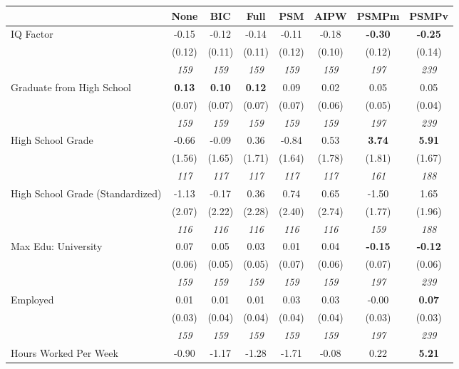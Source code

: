 \begin{tabular}{l c c c c c c c}
\toprule
 & None & BIC & Full & PSM & AIPW & PSMPm & PSMPv \\
\midrule
IQ Factor & -0.15 & -0.12 & -0.14 & -0.11 & -0.18 & \textbf{-0.30} & \textbf{-0.25} \\
& (0.12) & (0.11) & (0.11) & (0.12) & (0.10) & (0.12) & (0.14) \\
& \textit{ 159 } & \textit{ 159 } & \textit{ 159 } & \textit{ 159 } & \textit{ 159 } & \textit{ 197 } & \textit{ 239 } \\
Graduate from High School & \textbf{ 0.13 } & \textbf{ 0.10 } & \textbf{ 0.12 } & 0.09 & 0.02 & 0.05 & 0.05 \\
& (0.07) & (0.07) & (0.07) & (0.07) & (0.06) & (0.05) & (0.04) \\
& \textit{ 159 } & \textit{ 159 } & \textit{ 159 } & \textit{ 159 } & \textit{ 159 } & \textit{ 197 } & \textit{ 239 } \\
High School Grade & -0.66 & -0.09 & 0.36 & -0.84 & 0.53 & \textbf{3.74} & \textbf{5.91} \\
& (1.56) & (1.65) & (1.71) & (1.64) & (1.78) & (1.81) & (1.67) \\
& \textit{ 117 } & \textit{ 117 } & \textit{ 117 } & \textit{ 117 } & \textit{ 117 } & \textit{ 161 } & \textit{ 188 } \\
High School Grade (Standardized) & -1.13 & -0.17 & 0.36 & 0.74 & 0.65 & -1.50 & 1.65 \\
& (2.07) & (2.22) & (2.28) & (2.40) & (2.74) & (1.77) & (1.96) \\
& \textit{ 116 } & \textit{ 116 } & \textit{ 116 } & \textit{ 116 } & \textit{ 116 } & \textit{ 159 } & \textit{ 188 } \\
Max Edu: University & 0.07 & 0.05 & 0.03 & 0.01 & 0.04 & \textbf{-0.15} & \textbf{-0.12} \\
& (0.06) & (0.05) & (0.05) & (0.07) & (0.06) & (0.07) & (0.06) \\
& \textit{ 159 } & \textit{ 159 } & \textit{ 159 } & \textit{ 159 } & \textit{ 159 } & \textit{ 197 } & \textit{ 239 } \\
Employed & 0.01 & 0.01 & 0.01 & 0.03 & 0.03 & -0.00 & \textbf{0.07} \\
& (0.03) & (0.04) & (0.04) & (0.04) & (0.04) & (0.03) & (0.03) \\
& \textit{ 159 } & \textit{ 159 } & \textit{ 159 } & \textit{ 159 } & \textit{ 159 } & \textit{ 197 } & \textit{ 239 } \\
Hours Worked Per Week & -0.90 & -1.17 & -1.28 & -1.71 & -0.08 & 0.22 & \textbf{5.21} \\

\end{tabular}
